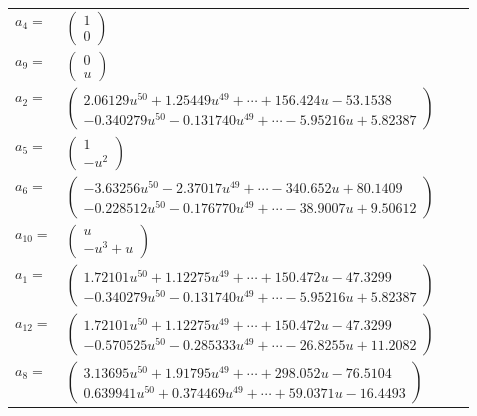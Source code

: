 \documentclass[1p]{elsarticle_modified}
\theoremstyle{definition}
\begin{document}
\begin{tabular}{m{7pt} m{180pt} m{7pt} m{180pt} }
\flushright $a_{4}=$&$\begin{pmatrix}1\\0\end{pmatrix}$ \\
\flushright $a_{9}=$&$\begin{pmatrix}0\\u\end{pmatrix}$ \\
\flushright $a_{2}=$&$\begin{pmatrix}2.06129 u^{50}+1.25449 u^{49}+\cdots+156.424 u-53.1538\\-0.340279 u^{50}-0.131740 u^{49}+\cdots-5.95216 u+5.82387\end{pmatrix}$ \\
\flushright $a_{5}=$&$\begin{pmatrix}1\\- u^2\end{pmatrix}$ \\
\flushright $a_{6}=$&$\begin{pmatrix}-3.63256 u^{50}-2.37017 u^{49}+\cdots-340.652 u+80.1409\\-0.228512 u^{50}-0.176770 u^{49}+\cdots-38.9007 u+9.50612\end{pmatrix}$ \\
\flushright $a_{10}=$&$\begin{pmatrix}u\\- u^3+u\end{pmatrix}$ \\
\flushright $a_{1}=$&$\begin{pmatrix}1.72101 u^{50}+1.12275 u^{49}+\cdots+150.472 u-47.3299\\-0.340279 u^{50}-0.131740 u^{49}+\cdots-5.95216 u+5.82387\end{pmatrix}$ \\
\flushright $a_{12}=$&$\begin{pmatrix}1.72101 u^{50}+1.12275 u^{49}+\cdots+150.472 u-47.3299\\-0.570525 u^{50}-0.285333 u^{49}+\cdots-26.8255 u+11.2082\end{pmatrix}$ \\
\flushright $a_{8}=$&$\begin{pmatrix}3.13695 u^{50}+1.91795 u^{49}+\cdots+298.052 u-76.5104\\0.639941 u^{50}+0.374469 u^{49}+\cdots+59.0371 u-16.4493\end{pmatrix}$ \\

\end{tabular}
\end{document}
